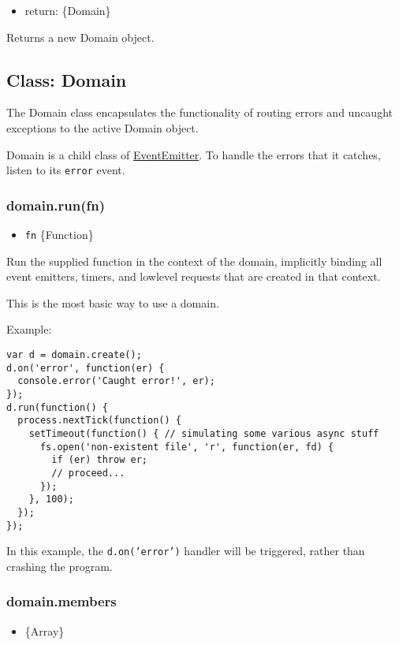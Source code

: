 \begin{itemize}
\item
  return: \{Domain\}
\end{itemize}

Returns a new Domain object.

\subsection{Class: Domain}

The Domain class encapsulates the functionality of routing errors and
uncaught exceptions to the active Domain object.

Domain is a child class of
\href{events.html\#events\_class\_events\_eventemitter}{EventEmitter}.
To handle the errors that it catches, listen to its \texttt{error}
event.

\subsubsection{domain.run(fn)}

\begin{itemize}
\item
  \texttt{fn} \{Function\}
\end{itemize}

Run the supplied function in the context of the domain, implicitly
binding all event emitters, timers, and lowlevel requests that are
created in that context.

This is the most basic way to use a domain.

Example:

\begin{verbatim}
var d = domain.create();
d.on('error', function(er) {
  console.error('Caught error!', er);
});
d.run(function() {
  process.nextTick(function() {
    setTimeout(function() { // simulating some various async stuff
      fs.open('non-existent file', 'r', function(er, fd) {
        if (er) throw er;
        // proceed...
      });
    }, 100);
  });
});
\end{verbatim}

In this example, the \texttt{d.on('error')} handler will be triggered,
rather than crashing the program.

\subsubsection{domain.members}

\begin{itemize}
\item
  \{Array\}
\end{itemize}


